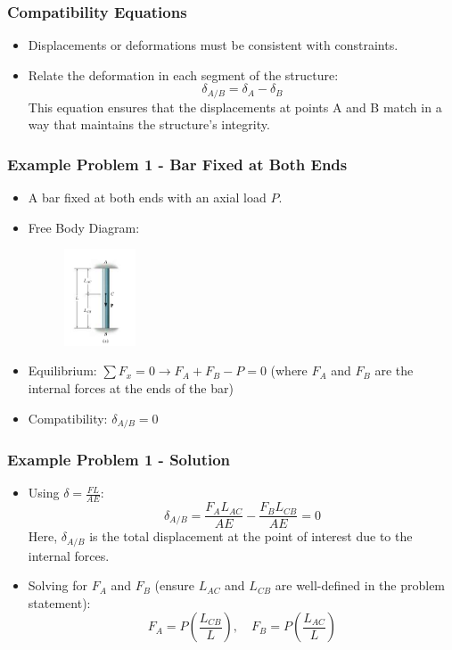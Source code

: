 \documentclass{beamer}
\begin{document}
\begin{frame}
    \frametitle{Compatibility Equations}
    \begin{itemize}
        \item Displacements or deformations must be consistent with constraints.
        \item Relate the deformation in each segment of the structure:
            \[
            \delta_{A/B} = \delta_A - \delta_B
            \]
            This equation ensures that the displacements at points A and B match in a way that maintains the structure's integrity.
    \end{itemize}
\end{frame}

\begin{frame}
    \frametitle{Example Problem 1 - Bar Fixed at Both Ends}
    \begin{itemize}
        \item A bar fixed at both ends with an axial load $P$.
        \item Free Body Diagram:
        \begin{figure}
            \includegraphics[width=0.2\textwidth]{Beam.png}
        \end{figure}
        \item Equilibrium: $\sum F_x = 0 \rightarrow F_A + F_B - P = 0$ (where $F_A$ and $F_B$ are the internal forces at the ends of the bar)
        \item Compatibility: $\delta_{A/B} = 0$
    \end{itemize}
\end{frame}

\begin{frame}
    \frametitle{Example Problem 1 - Solution}
    \begin{itemize}
        \item Using $\delta = \frac{FL}{AE}$:
            \[
            \delta_{A/B} = \frac{F_A L_{AC}}{AE} - \frac{F_B L_{CB}}{AE} = 0
            \]
            Here, $\delta_{A/B}$ is the total displacement at the point of interest due to the internal forces.
        \item Solving for $F_A$ and $F_B$ (ensure $L_{AC}$ and $L_{CB}$ are well-defined in the problem statement):
            \[
            F_A = P \left(\frac{L_{CB}}{L}\right), \quad F_B = P \left(\frac{L_{AC}}{L}\right)
            \]
    \end{itemize}
\end{frame}
\end{document}
